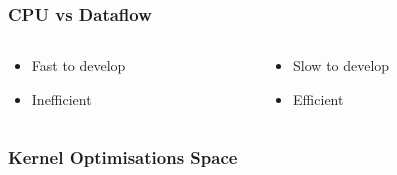 \begin{frame}
  \frametitle{CPU vs Dataflow}
  \begin{columns}
    \begin{column}{.5\linewidth}
      \vspace{-1cm}
      \begin{figure}[!ht]
        \centering
        \def\svgwidth{\linewidth}
        
      \end{figure}
      \vspace{-0.5cm}
      \begin{itemize}
      \item Fast to develop
      \item Inefficient
      \end{itemize}
    \end{column}
    \begin{column}{.5\linewidth}
      \vspace{-1cm}
      \begin{figure}[!ht]
        \centering
        \def\svgwidth{\linewidth}
        
      \end{figure}
      \vspace{-0.5cm}
      \begin{itemize}
      \item Slow to develop
      \item Efficient
      \end{itemize}
    \end{column}
  \end{columns}
\end{frame}

\begin{frame}[fragile]
  \frametitle{Kernel Optimisations Space}
  \begin{figure}[!ht]
    \centering
    \def\svgwidth{\linewidth}
    
  \end{figure}
\end{frame}

